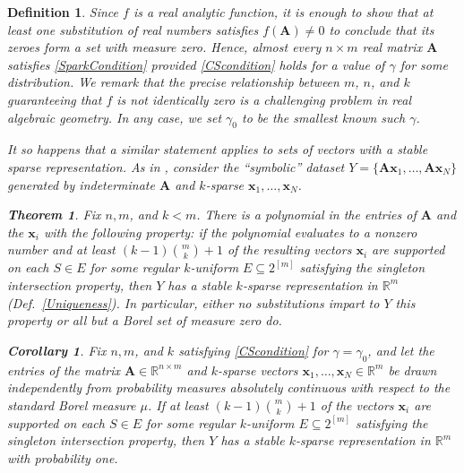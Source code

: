 \documentclass[9pt,twocolumn]{pnas-new}
\newtheorem{theorem}{Theorem}
\newtheorem{definition}{Definition}
\newtheorem{corollary}{Corollary}
\begin{document}
\begin{definition}
Since $f$ is a real analytic function, it is enough to show that at least one substitution of real numbers satisfies $f(\mathbf{A}) \neq 0$ to conclude that its zeroes form a set with measure zero. Hence, almost every $n \times m$ real matrix $\mathbf{A}$ satisfies \eqref{SparkCondition} provided \eqref{CScondition} holds for a value of $\gamma$ for some distribution. We remark that the precise relationship between $m$, $n$, and $k$ guaranteeing that $f$ is not identically zero is a challenging problem in real algebraic geometry. In any case, we set $\gamma_0$ to be the smallest known such $\gamma$.

It so happens that a similar statement applies to sets of vectors with a stable sparse representation. As in \cite[Sec.~IV]{Hillar15}, consider the ``symbolic'' dataset $Y = \{\mathbf{A}\mathbf{x}_1,\ldots,\mathbf{A} \mathbf{x}_N\}$ generated by indeterminate $\mathbf{A}$ and $k$-sparse $\mathbf{x}_1, \ldots, \mathbf{x}_N$. 

\begin{theorem}\label{robustPolythm} %
Fix $n, m$, and $k < m$. There is a polynomial in the entries of $\mathbf{A}$ and the $\mathbf{x}_i$ with the following property:  if the polynomial evaluates to a nonzero number and at least \mbox{$(k-1){m \choose k}+1$} of the resulting vectors $\mathbf{x}_i$ are supported on each $S \in E$ for some regular $k$-uniform $E \subseteq 2^{[m]}$ satisfying the singleton intersection property, then $Y$ has a stable $k$-sparse representation in $\mathbb{R}^m$ (Def.~\ref{Uniqueness}). In particular, either no substitutions impart to $Y$ this property or all but a Borel set of measure zero do. 
\end{theorem}


\begin{corollary}\label{ProbabilisticCor}
Fix $n, m$, and $k$ satisfying \eqref{CScondition} for $\gamma = \gamma_0$, and let the entries of the matrix $\mathbf{A} \in \mathbb{R}^{n \times m}$ and $k$-sparse vectors $\mathbf{x}_1, \ldots, \mathbf{x}_N \in \mathbb{R}^m$ be drawn independently from probability measures absolutely continuous with respect to the standard Borel measure $\mu$. If at least $(k-1){m \choose k} + 1$ of the vectors $\mathbf{x}_i$ are supported on each $S \in E$ for some regular $k$-uniform $E \subseteq 2^{[m]}$ satisfying the singleton intersection property, then $Y$ has a stable $k$-sparse representation in $\mathbb{R}^m$ with probability one.
\end{corollary}


\end{definition}
\end{document}
